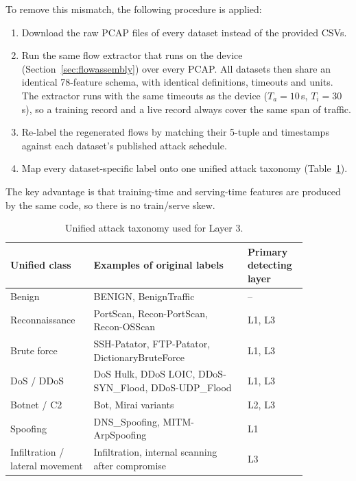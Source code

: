 \noindent To remove this mismatch, the following procedure is applied:
\begin{enumerate}
    \item Download the raw PCAP files of every dataset instead of the provided CSVs.
    \item Run the same flow extractor that runs on the device (Section~\ref{sec:flowassembly}) over every PCAP. All datasets then share an identical 78-feature schema, with identical definitions, timeouts and units. The extractor runs with the same timeouts as the device ($T_a = 10$\,s, $T_i = 30$\,s), so a training record and a live record always cover the same span of traffic.
    \item Re-label the regenerated flows by matching their 5-tuple and timestamps against each dataset's published attack schedule.
    \item Map every dataset-specific label onto one unified attack taxonomy (Table~\ref{tab:taxonomy}).
\end{enumerate}
\noindent The key advantage is that training-time and serving-time features are produced by the same code, so there is no train/serve skew.

\begin{table}[H]
\centering
\caption{Unified attack taxonomy used for Layer 3.}
\label{tab:taxonomy}
\begin{tabular}{|>{\raggedright\arraybackslash}p{0.24\linewidth}|>{\raggedright\arraybackslash}p{0.46\linewidth}|>{\raggedright\arraybackslash}p{0.16\linewidth}|}
\hline
\textbf{Unified class} & \textbf{Examples of original labels} & \textbf{Primary detecting layer} \\
\hline
Benign & BENIGN, BenignTraffic & -- \\
\hline
Reconnaissance & PortScan, Recon-PortScan, Recon-OSScan & L1, L3 \\
\hline
Brute force & SSH-Patator, FTP-Patator, DictionaryBruteForce & L1, L3 \\
\hline
DoS / DDoS & DoS Hulk, DDoS LOIC, DDoS-SYN\_Flood, DDoS-UDP\_Flood & L1, L3 \\
\hline
Botnet / C2 & Bot, Mirai variants & L2, L3 \\
\hline
Spoofing & DNS\_Spoofing, MITM-ArpSpoofing & L1 \\
\hline
Infiltration / lateral movement & Infiltration, internal scanning after compromise & L3 \\
\hline
\end{tabular}
\end{table}

